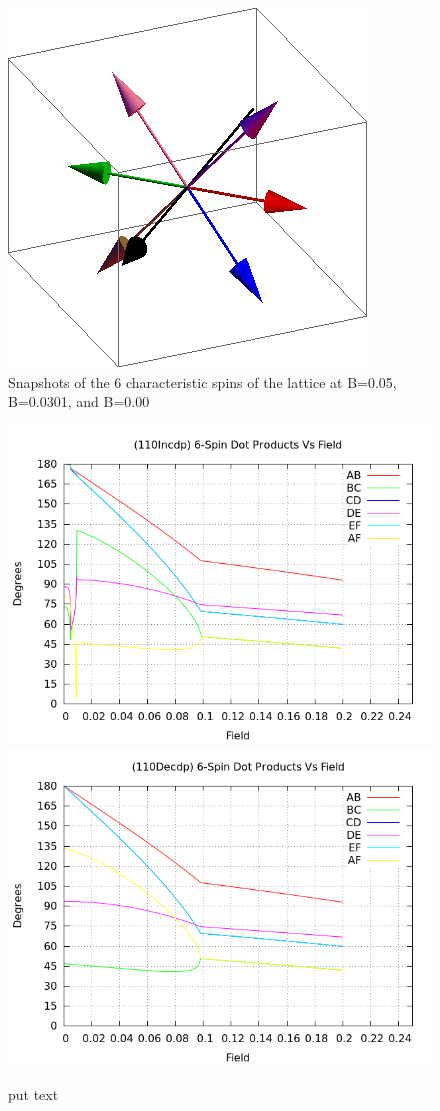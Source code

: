 \documentclass{article}
\begin{document}
\begin{figure}[ht]
\includegraphics[scale=0.32]{110/501S005to000G.png}
\caption{Snapshots of the 6 characteristic spins of the lattice at B=0.05, B=0.0301, and B=0.00}
\end{figure}
\clearpage

\begin{figure}[ht]
\centering
\includegraphics[scale=0.5]{HVariedData/Pictures/110Incdp.png}
\includegraphics[scale=0.5]{HVariedData/Pictures/110Decdp.png}
\caption{put text}
\end{figure}
\clearpage
\end{document}
